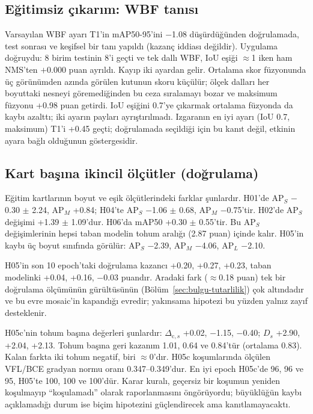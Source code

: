 \subsection{Eğitimsiz çıkarım: WBF tanısı}\label{sec:basarisiz-wbf}
Varsayılan WBF ayarı T1'in mAP50-95'ini $-$1.08 düşürdüğünden doğrulamada, test sonrası ve keşifsel bir tanı yapıldı (kazanç iddiası değildir). Uygulama doğruydu: 8 birim testinin 8'i geçti ve tek dallı WBF, IoU eşiği $\approx$1 iken ham NMS'ten $+0.000$ puan ayrıldı. Kayıp iki ayardan gelir. Ortalama skor füzyonunda üç görünümden azında görülen kutunun skoru küçülür; ölçek dalları her boyuttaki nesneyi göremediğinden bu ceza sıralamayı bozar ve maksimum füzyonu +0.98 puan getirdi. IoU eşiğini 0.7'ye çıkarmak ortalama füzyonda da kaybı azalttı; iki ayarın payları ayrıştırılmadı. Izgaranın en iyi ayarı (IoU 0.7, maksimum) T1'i +0.45 geçti; doğrulamada seçildiği için bu kanıt değil, etkinin ayara bağlı olduğunun göstergesidir.

\subsection{Kart başına ikincil ölçütler (doğrulama)}
Eğitim kartlarının boyut ve eşik ölçütlerindeki farklar şunlardır. H01'de AP$_S$ $-$0.30 $\pm$ 2.24, AP$_M$ +0.84; H04'te AP$_S$ $-$1.06 $\pm$ 0.68, AP$_M$ $-$0.75'tir. H02'de AP$_S$ değişimi +1.39 $\pm$ 1.09'dur. H06'da mAP50 +0.30 $\pm$ 0.55'tir. Bu AP$_S$ değişimlerinin hepsi taban modelin tohum aralığı (2.87 puan) içinde kalır. H05'in kaybı üç boyut sınıfında görülür: AP$_S$ $-$2.39, AP$_M$ $-$4.06, AP$_L$ $-$2.10.

H05'in son 10 epoch'taki doğrulama kazancı +0.20, +0.27, +0.23, taban modelinki +0.04, +0.16, $-$0.03 puandır. Aradaki fark ($\approx$0.18 puan) tek bir doğrulama ölçümünün gürültüsünün (Bölüm~\ref{sec:bulgu-tutarlilik}) çok altındadır ve bu evre mosaic'in kapandığı evredir; yakınsama hipotezi bu yüzden yalnız zayıf desteklenir.

H05c'nin tohum başına değerleri şunlardır: $\Delta_{\mathrm{c},s}$ +0.02, $-$1.15, $-$0.40; $D_s$ +2.90, +2.04, +2.13. Tohum başına geri kazanım 1.01, 0.64 ve 0.84'tür (ortalama 0.83). Kalan farkta iki tohum negatif, biri $\approx$0'dır. H05c koşumlarında ölçülen VFL/BCE gradyan normu oranı 0.347--0.349'dur. En iyi epoch H05c'de 96, 96 ve 95, H05'te 100, 100 ve 100'dür. Karar kuralı, geçersiz bir koşumun yeniden koşulmayıp ``koşulamadı'' olarak raporlanmasını öngörüyordu; büyüklüğün kaybı açıklamadığı durum ise biçim hipotezini güçlendirecek ama kanıtlamayacaktı.

